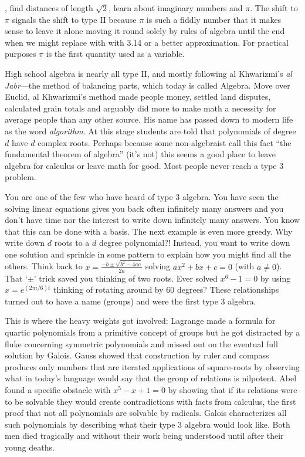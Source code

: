 , find distances of
length $\sqrt{2}$, learn about imaginary numbers and $\pi$.  The shift to $\pi$
signals the shift to type II because $\pi$ is such a fiddly number that it
makes sense to leave it alone moving it round solely by rules of algebra until
the end when we might replace with with 3.14 or a better approximation. For
practical purposes $\pi$ is the first quantity used as a variable. 

High school algebra is nearly all type II, and mostly following al
Khwarizmi's \emph{al Jabr}---the method of balancing parts, which today is
called Algebra.  Move over Euclid, al Khwarizmi's method made people money,
settled land disputes, calculated grain totals and arguably did more to make
math a necessity for average people than any other source. His name has passed
down to modern life as the word \emph{algorithm}. At this stage students are
told  that polynomials of degree $d$ have $d$ complex roots.  Perhaps because
some non-algebraist call this fact ``the fundamental theorem of algebra'' (it's
not) this seems a good place to leave algebra for calculus or leave math for
good.  Most people never reach a type 3 problem.

You are one of the few who have heard of type 3 algebra.
You have seen the solving linear equations gives you back often infinitely many 
answers and you don't have time nor the interest to write down infinitely many answers.
You know that this can be done with a basis.  The next example is even more 
greedy.  Why write down $d$ roots to a $d$ degree polynomial?!  Instead, you 
want to write down one solution and sprinkle in some pattern to explain how you 
might find all the others.  Think back to 
$x=\frac{-b\pm \sqrt{b^2-4ac}}{2a}$ solving $ax^2+bx+c=0$ (with $a\neq 0$).
That `$\pm$' trick saved you thinking of two roots.  Ever solved $x^6-1=0$ by 
using $x=e^{(2\pi i/6) t}$ thinking of rotating around by 60 degrees?  
These relationships turned out to have a name (groups) and were the first type 3 
algebra.

This is where the heavy weights got
involved: Lagrange made a formula for quartic polynomials from a primitive
concept of groups but he got distracted by a fluke concerning symmetric polynomials 
and missed out on the eventual full solution by Galois.
Gauss showed that construction by ruler and compass produces only numbers 
that are iterated applications of square-roots by observing what in today's 
language would say that the group of relations is nilpotent. 
Abel found a specific obstacle with $x^5-x+1=0$ by showing that if its relations 
were to be solvable they would create contradictions with facts from calculus,
the first proof that not all polynomials are solvable by radicals.  
Galois characterizes all such polynomials by describing what their type 3
algebra would look like.  Both men died tragically and without their work being 
understood until after their young deaths.

